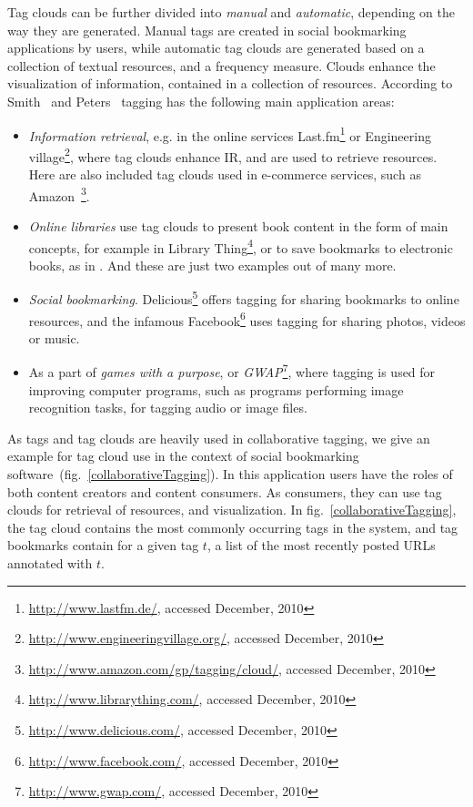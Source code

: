 Tag clouds can be further divided into \textit{manual} and \textit{automatic}, depending on the way they are generated. Manual tags are created in social bookmarking applications by users, while automatic tag clouds are generated based on a collection of textual resources, and a frequency measure. Clouds enhance the visualization of information, contained in a collection of resources. According to Smith~\cite{tagging2008} and Peters~\cite{folksonomiesWeb2.0_2009} tagging has the following main application areas: \\
\begin{itemize}
\item \textit{Information retrieval}, e.g. in the online services Last.fm\footnote{\url{http://www.lastfm.de/}, accessed December, 2010} or Engineering village\footnote{\url{http://www.engineeringvillage.org/}, accessed December, 2010}, where tag clouds enhance \gls{IR}, and are used to retrieve resources. Here are also included tag clouds used in e-commerce services, such as Amazon~\footnote{\url{http://www.amazon.com/gp/tagging/cloud/}, accessed December, 2010}.

\item \textit{Online libraries} use tag clouds to present book content in the form of main concepts, for example in Library Thing\footnote{\url{http://www.librarything.com/}, accessed December, 2010}, or to save bookmarks to electronic books, as in  . And these are just two examples out of many more. \\

\item \textit{Social bookmarking}. Delicious\footnote{\url{http://www.delicious.com/}, accessed December, 2010} offers tagging for sharing bookmarks to online resources, and the infamous Facebook\footnote{\url{http://www.facebook.com/}, accessed December, 2010}  uses tagging for sharing photos, videos or music. \\

\item As a part of \textit{games with a purpose}, or \textit{GWAP}\footnote{\url{http://www.gwap.com/}, accessed December, 2010}, where tagging is used for improving computer programs, such as programs performing image recognition tasks, for tagging audio or image files. \\ 
\end{itemize}

As tags and tag clouds are heavily used in collaborative tagging, we give an example for tag cloud use in the context of social bookmarking software~(fig.~\ref{collaborativeTagging}). In this application users have the roles of both content creators and content consumers. As consumers, they can use tag clouds for retrieval of resources, and visualization. In fig.~\ref{collaborativeTagging}, the tag cloud contains the most commonly occurring tags in the system, and tag bookmarks contain for a given tag $t$, a list of the most recently posted URLs annotated with $t$.  \\  

